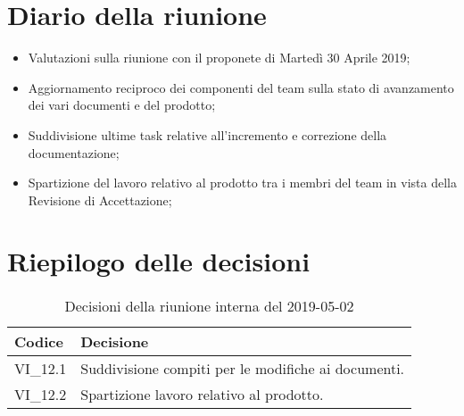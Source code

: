 \section{Diario della riunione}
\begin{itemize}
	\item Valutazioni sulla riunione con il proponete di Martedì 30 Aprile 2019;
	\item Aggiornamento reciproco dei componenti del team sulla stato di 
	avanzamento dei vari documenti e del prodotto;
	\item Suddivisione ultime task relative all'incremento e correzione della 
	documentazione;
	\item Spartizione del lavoro relativo al prodotto tra i membri del team in 
	vista della Revisione di Accettazione;
	
\end{itemize}

\hspace{3cm}

\section{Riepilogo delle decisioni}

	
	\begin{longtable}{ >{\centering}p{} >{}p{}}
		\caption{Decisioni della riunione interna del 2019-05-02}\\	
		\rowcolorhead
		\textbf{\color{white}Codice} 
		& \centering\textbf{\color{white}Decisione} 
		\tabularnewline 
		\endfirsthead
		VI\_12.1 & Suddivisione compiti per le modifiche ai documenti.
		\tabularnewline 
		VI\_12.2 & Spartizione lavoro relativo al prodotto.	
	\end{longtable}
	




